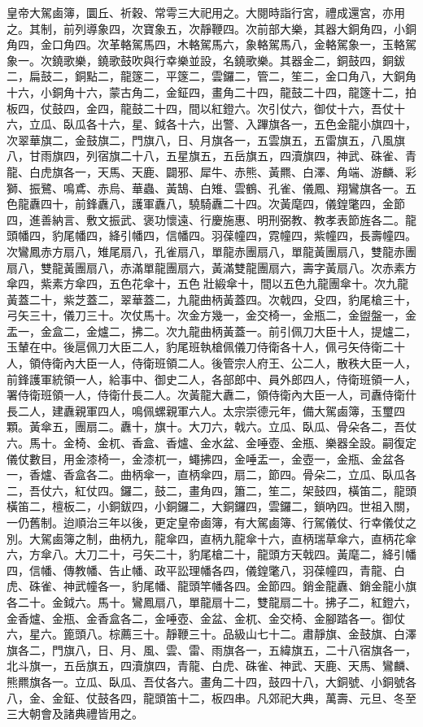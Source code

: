 \begin{pinyinscope}
皇帝大駕鹵簿，圜丘、祈穀、常雩三大祀用之。大閱時詣行宮，禮成還宮，亦用之。其制，前列導象四，次寶象五，次靜鞭四。次前部大樂，其器大銅角四，小銅角四，金口角四。次革輅駕馬四，木輅駕馬六，象輅駕馬八，金輅駕象一，玉輅駕象一。次鐃歌樂，鐃歌鼓吹與行幸樂並設，名鐃歌樂。其器金二，銅鼓四，銅鈸二，扁鼓二，銅點二，龍篴二，平篴二，雲鑼二，管二，笙二，金口角八，大銅角十六，小銅角十六，蒙古角二，金鉦四，畫角二十四，龍鼓二十四，龍篴十二，拍板四，仗鼓四，金四，龍鼓二十四，間以紅鐙六。次引仗六，御仗十六，吾仗十六，立瓜、臥瓜各十六，星、鉞各十六，出警、入蹕旗各一，五色金龍小旗四十，次翠華旗二，金鼓旗二，門旗八，日、月旗各一，五雲旗五，五雷旗五，八風旗八，甘雨旗四，列宿旗二十八，五星旗五，五岳旗五，四瀆旗四，神武、硃雀、青龍、白虎旗各一，天馬、天鹿、闢邪、犀牛、赤熊、黃羆、白澤、角端、游麟、彩獅、振鷺、鳴鳶、赤烏、華蟲、黃鵠、白雉、雲鶴、孔雀、儀鳳、翔鸞旗各一。五色龍纛四十，前鋒纛八，護軍纛八，驍騎纛二十四。次黃麾四，儀鍠氅四，金節四，進善納言、敷文振武、褒功懷遠、行慶施惠、明刑弼教、教孝表節旌各二。龍頭幡四，豹尾幡四，絳引幡四，信幡四。羽葆幢四，霓幢四，紫幢四，長壽幢四。次鸞鳳赤方扇八，雉尾扇八，孔雀扇八，單龍赤團扇八，單龍黃團扇八，雙龍赤團扇八，雙龍黃團扇八，赤滿單龍團扇六，黃滿雙龍團扇六，壽字黃扇八。次赤素方傘四，紫素方傘四，五色花傘十，五色壯緞傘十，間以五色九龍團傘十。次九龍黃蓋二十，紫芝蓋二，翠華蓋二，九龍曲柄黃蓋四。次戟四，殳四，豹尾槍三十，弓矢三十，儀刀三十。次仗馬十。次金方幾一，金交椅一，金瓶二，金盥盤一，金盂一，金盒二，金爐二，拂二。次九龍曲柄黃蓋一。前引佩刀大臣十人，提爐二，玉輦在中。後扈佩刀大臣二人，豹尾班執槍佩儀刀侍衛各十人，佩弓矢侍衛二十人，領侍衛內大臣一人，侍衛班領二人。後管宗人府王、公二人，散秩大臣一人，前鋒護軍統領一人，給事中、御史二人，各部郎中、員外郎四人，侍衛班領一人，署侍衛班領一人，侍衛什長二人。次黃龍大纛二，領侍衛內大臣一人，司纛侍衛什長二人，建纛親軍四人，鳴佩螺親軍六人。太宗崇德元年，備大駕鹵簿，玉璽四顆。黃傘五，團扇二。纛十，旗十。大刀六，戟六。立瓜、臥瓜、骨朵各二，吾仗六。馬十。金椅、金杌、香盒、香爐、金水盆、金唾壺、金瓶、樂器全設。嗣復定儀仗數目，用金漆椅一，金漆杌一，蠅拂四，金唾盂一，金壺一，金瓶、金盆各一，香爐、香盒各二。曲柄傘一，直柄傘四，扇二，節四。骨朵二，立瓜、臥瓜各二，吾仗六，紅仗四。鑼二，鼓二，畫角四，簫二，笙二，架鼓四，橫笛二，龍頭橫笛二，檀板二，小銅鈸四，小銅鑼二，大銅鑼四，雲鑼二，鎖吶四。世祖入關，一仍舊制。迨順治三年以後，更定皇帝鹵簿，有大駕鹵簿、行駕儀仗、行幸儀仗之別。大駕鹵簿之制，曲柄九，龍傘四，直柄九龍傘十六，直柄瑞草傘六，直柄花傘六，方傘八。大刀二十，弓矢二十，豹尾槍二十，龍頭方天戟四。黃麾二，絳引幡四，信幡、傳教幡、告止幡、政平訟理幡各四，儀鍠氅八，羽葆幢四，青龍、白虎、硃雀、神武幢各一，豹尾幡、龍頭竿幡各四。金節四。銷金龍纛、銷金龍小旗各二十。金鉞六。馬十。鸞鳳扇八，單龍扇十二，雙龍扇二十。拂子二，紅鐙六，金香爐、金瓶、金香盒各二，金唾壺、金盆、金杌、金交椅、金腳踏各一。御仗六，星六。篦頭八。棕薦三十。靜鞭三十。品級山七十二。肅靜旗、金鼓旗、白澤旗各二，門旗八，日、月、風、雲、雷、雨旗各一，五緯旗五，二十八宿旗各一，北斗旗一，五岳旗五，四瀆旗四，青龍、白虎、硃雀、神武、天鹿、天馬、鸞麟、熊羆旗各一。立瓜、臥瓜、吾仗各六。畫角二十四，鼓四十八，大銅號、小銅號各八，金、金鉦、仗鼓各四，龍頭笛十二，板四串。凡郊祀大典，萬壽、元旦、冬至三大朝會及諸典禮皆用之。


\end{pinyinscope}
